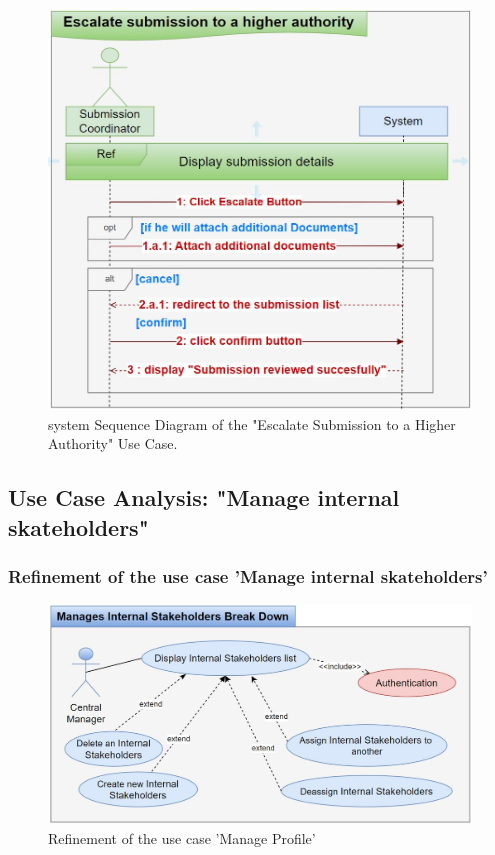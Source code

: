 \clearpage
\begin{figure}[h!]
    \centering
    \includegraphics[width=1\textwidth]{figures/seqescalate_submission.png}
    \caption{system Sequence Diagram of the "Escalate Submission to a Higher Authority" \centering Use Case.}
\end{figure}
\clearpage
\subsection{Use Case Analysis: "Manage internal skateholders"}
\subsubsection{Refinement of the use case 'Manage internal skateholders'}
\begin{figure}[h!]
    \centering
    \includegraphics[width=1\textwidth]{figures/bdManages Internal Stakeholders.png}
    \caption{Refinement of the use case 'Manage Profile'}
\end{figure}\
\clearpage

